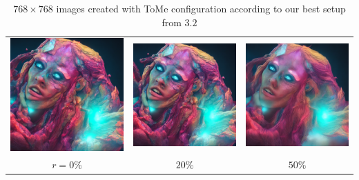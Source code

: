 \begin{table}[!htb]
\centering
\begin{tabular}{c c c}
    \includegraphics[width=0.3\linewidth]{static/sample_imgs/main_1x2/color_head_0.png} & \includegraphics[width=0.3\linewidth]{static/sample_imgs/main_1x2/color_head_20.png} &
    \includegraphics[width=0.3\linewidth]{static/sample_imgs/main_1x2/color_head_50.png}\\
    \(r=0\%\) & \(20\%\) & \(50\%\) \\
\end{tabular}
\caption{$768 \times 768$ images created with ToMe configuration according to our best setup from \(3.2\)}
\end{table}


